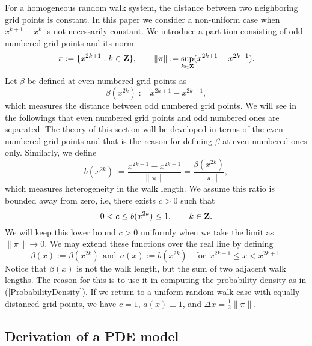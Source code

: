 \documentclass[11pt]{amsart}
\def\Z{{\bf Z}}
\begin{document}
For a homogeneous random walk system, the distance between two neighboring grid points is constant. In this paper we consider a non-uniform case when $x^{k+1}-x^{k}$ is not necessarily constant. We introduce a partition consisting of odd numbered grid points and its norm:
\begin{equation}\label{pi}
\pi:=\{x^{2k+1}:k\in\Z\},\qquad\|\pi\|:=\sup_{k\in\Z}(x^{2k+1}-x^{2k-1}).
\end{equation}
Let $\beta$ be defined at even numbered grid points as
\begin{equation}\label{betax2k}
\beta(x^{2k}):=x^{2k+1}-x^{2k-1},
\end{equation}
which measures the distance between odd numbered grid points. We will see in the followings that even numbered grid points and odd numbered ones are separated. The theory of this section will be developed in terms of the even numbered grid points and that is the reason for defining $\beta$ at even numbered ones only. Similarly, we define
\begin{equation}\label{bx2k}
b(x^{2k}):=\frac{x^{2k+1}-x^{2k-1}}{\|\pi\|}=\frac{\beta(x^{2k})}{\|\pi\|},
\end{equation}
which measures heterogeneity in the walk length. We assume this ratio is bounded away from zero, i.e, there exists $c>0$ such that
\begin{equation}\label{c}
0<c\le b(x^{2k})\le 1,\qquad k\in\Z.
\end{equation}
We will keep this lower bound $c>0$ uniformly when we take the limit as $\|\pi\|\to0$. We may extend these functions over the real line by defining
\begin{equation}\label{continuation}
\beta(x):=\beta(x^{2k})\ \
 \text{and}\ \ a(x):=b(x^{2k})\quad\text{for}\ \ x^{2k-1}\leq x<x^{2k+1}.
\end{equation}
Notice that $\beta(x)$ is not the walk length, but the sum of two adjacent walk lengths. The reason for this is to use it in computing the probability density as in (\ref{ProbabilityDensity}). If we return to a uniform random walk case with equally distanced grid points, we have $c=1$, $a(x)\equiv 1$, and $\Delta x =\frac{1}{2}\|\pi\|$.

\subsection{Derivation of a PDE model}
\end{document}
